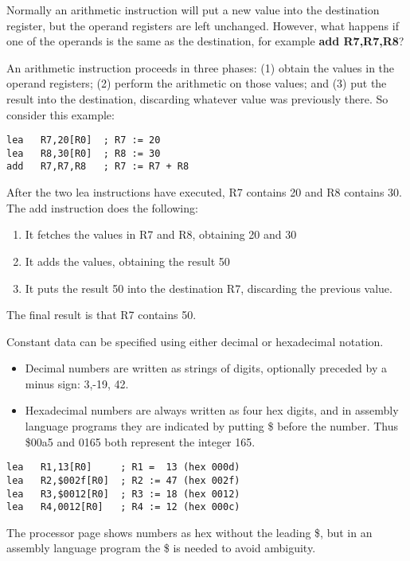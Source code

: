 \documentclass[11pt]{article}
\begin{document}
\begin{itemize}
Normally an arithmetic instruction will put a new value into the
destination register, but the operand registers are left unchanged.
However, what happens if one of the operands is the same as the
destination, for example \textbf{add R7,R7,R8}?

An arithmetic instruction proceeds in three phases: (1) obtain the
values in the operand registers; (2) perform the arithmetic on those
values; and (3) put the result into the destination, discarding
whatever value was previously there.  So consider this example:

\begin{verbatim}
lea   R7,20[R0]  ; R7 := 20
lea   R8,30[R0]  ; R8 := 30
add   R7,R7,R8   ; R7 := R7 + R8
\end{verbatim}

After the two lea instructions have executed, R7 contains 20 and R8
contains 30.  The add instruction does the following:

\begin{enumerate}
\item It fetches the values in R7 and R8, obtaining 20 and 30
\item It adds the values, obtaining the result 50
\item It puts the result 50 into the destination R7, discarding the
previous value.
\end{enumerate}

The final result is that R7 contains 50.

Constant data can be specified using either decimal or hexadecimal
notation.

\begin{itemize}
\item Decimal numbers are written as strings of digits, optionally
preceded by a minus sign: 3,-19, 42.

\item Hexadecimal numbers are always written as four hex digits, and in
assembly language programs they are indicated by putting \$ before
the number.  Thus \$00a5 and 0165 both represent the integer 165.
\end{itemize}

\begin{verbatim}
lea   R1,13[R0]     ; R1 =  13 (hex 000d)
lea   R2,$002f[R0]  ; R2 := 47 (hex 002f)
lea   R3,$0012[R0]  ; R3 := 18 (hex 0012)
lea   R4,0012[R0]   ; R4 := 12 (hex 000c)
\end{verbatim}

The processor page shows numbers as hex without the leading \$, but in
an assembly language program the \$ is needed to avoid ambiguity.


\end{itemize}
\end{document}
